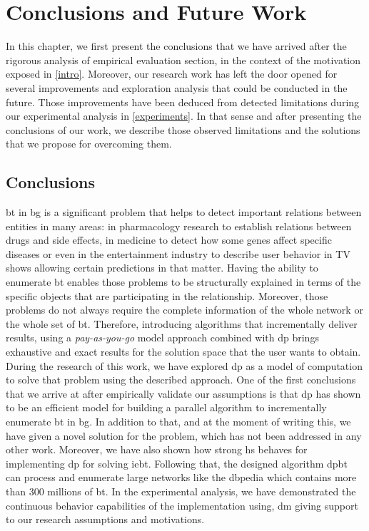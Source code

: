 \chapter{Conclusions and Future Work}\label{conclusions}
In this chapter, we first present the conclusions that we have arrived after the rigorous analysis of empirical evaluation section, 
in the context of the motivation exposed in \autoref{intro}.
Moreover, our research work has left the door opened for several improvements and exploration analysis that could be conducted in the future.
Those improvements have been deduced from detected limitations during our experimental analysis in \autoref{experiments}. In that sense and after 
presenting the conclusions of our work, we describe those observed limitations and the solutions that we propose for overcoming them.


\section{Conclusions}
\acrlong{bt} in \acrlong{bg} is a significant problem that helps to detect important relations between entities in many areas: in pharmacology research to establish relations between drugs and side effects, in medicine to detect how some genes affect specific diseases
or even in the entertainment industry to describe user behavior in TV shows allowing certain predictions in that matter.
Having the ability to enumerate \acrlong{bt} enables those problems to be structurally explained in terms of the specific objects that are participating in the relationship.  
Moreover, those problems do not always require the complete information of the whole network or the whole set of \acrlong{bt}. 
Therefore, introducing algorithms that incrementally deliver results, using a \emph{pay-as-you-go} model approach combined with \acrshort{dp} brings exhaustive and exact results for the solution space that the user wants to obtain. 
During the research of this work, we have explored \acrfull{dp} as a model of computation to solve that problem using the described approach. 
One of the first conclusions that we arrive at after empirically validate our assumptions is that \acrlong{dp} has shown to be an efficient model for building a parallel algorithm to incrementally enumerate \acrlong{bt} in \acrlong{bg}. 
In addition to that, and at the moment of writing this, we have given a novel solution for the problem, which has not been addressed in any other work.
Moreover, we have also shown how strong \acrfull{hs} behaves for implementing \acrfull{dp} for solving \acrlong{iebt}. 
Following that, the designed algorithm \acrshort{dpbt} can process and enumerate large networks like the \acrlong{dbpedia} which contains more than $300$ millions of \acrlong{bt}.
In the experimental analysis, we have demonstrated the continuous behavior capabilities of the implementation using, \acrlong{dm} giving support to our research assumptions and motivations. 


